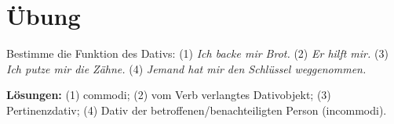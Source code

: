 \documentclass[a4paper,11pt]{article}
\begin{document}
\section{Übung}
Bestimme die Funktion des Dativs: (1) \textit{Ich backe mir Brot.} (2) \textit{Er hilft mir.} (3) \textit{Ich putze mir die Zähne.} (4) \textit{Jemand hat mir den Schlüssel weggenommen.}

\textbf{Lösungen:} (1) commodi; (2) vom Verb verlangtes Dativobjekt; (3) Pertinenzdativ; (4) Dativ der betroffenen/benachteiligten Person (incommodi).
\end{document}
